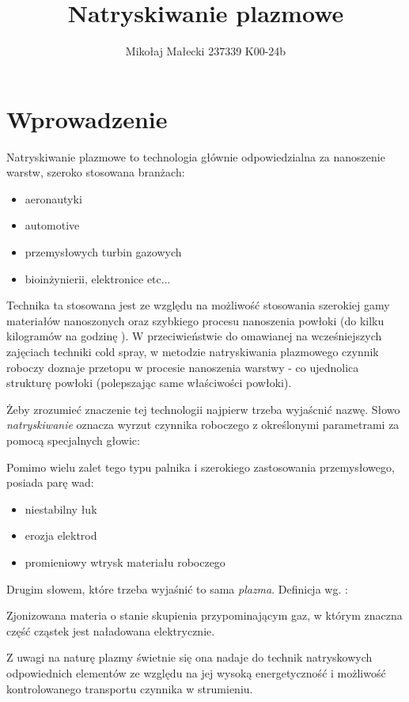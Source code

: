 \documentclass[13pt]{article}
\title{Natryskiwanie plazmowe}
\author{Mikołaj Małecki 237339 K00-24b}
\begin{document}
	\maketitle
	
\section{Wprowadzenie}
Natryskiwanie plazmowe to technologia głównie odpowiedzialna za nanoszenie warstw, szeroko stosowana branżach:
\begin{itemize}
\item aeronautyki
\item automotive
\item przemysłowych turbin gazowych
\item bioinżynierii, elektronice etc...
\end{itemize}
Technika ta stosowana jest ze względu na możliwość stosowania szerokiej gamy materiałów nanoszonych oraz szybkiego procesu nanoszenia powłoki (do kilku kilogramów na godzinę \cite{persp}). W przeciwieństwie do omawianej na wcześniejszych zajęciach techniki cold spray, w metodzie natryskiwania plazmowego czynnik roboczy doznaje przetopu w procesie nanoszenia warstwy - co ujednolica strukturę powłoki (polepszając same właściwości powłoki).

Żeby zrozumieć znaczenie tej technologii najpierw trzeba wyjaścnić nazwę. Słowo \textit{natryskiwanie} oznacza wyrzut czynnika roboczego z określonymi parametrami za pomocą specjalnych głowic:

\newpage

Pomimo wielu zalet tego typu palnika i szerokiego zastosowania przemysłowego, posiada parę wad:
\begin{itemize}
\item niestabilny łuk
\item erozja elektrod
\item promieniowy wtrysk materiału roboczego
\end{itemize}



Drugim słowem, które trzeba wyjaśnić to sama \textit{plazma}. Definicja wg. \cite{plazma}:
\begin{definition}[Plazma]
Zjonizowana materia o stanie skupienia przypominającym gaz, w którym znaczna część cząstek jest naładowana elektrycznie.
\end{definition}
Z uwagi na naturę plazmy świetnie się ona nadaje do technik natryskowych odpowiednich elementów ze względu na jej wysoką energetyczność i możliwość kontrolowanego transportu czynnika w strumieniu.
\end{document}
